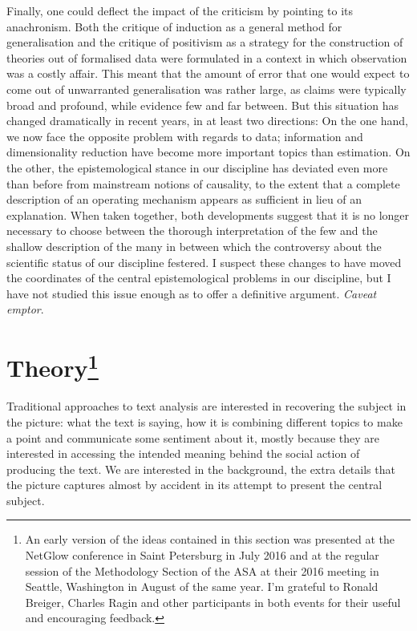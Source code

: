 Finally, one could deflect the impact of the criticism by pointing to its anachronism.
Both the critique of induction as a general method for generalisation and the critique of positivism as a strategy for the construction of theories out of formalised data were formulated in a context in which observation was a costly affair.
This meant that the amount of error that one would expect to come out of unwarranted generalisation was rather large, as claims were typically broad and profound, while evidence few and far between.
But this situation has changed dramatically in recent years, in at least two directions:
On the one hand, we now face the opposite problem with regards to data; information and dimensionality reduction have become more important topics than estimation.
On the other, the epistemological stance in our discipline has deviated even more than before from mainstream notions of causality, to the extent that a complete description of an operating mechanism appears as sufficient in lieu of an explanation.
When taken together, both developments suggest that it is no longer necessary to choose between the thorough interpretation of the few and the shallow description of the many in between which the controversy about the scientific status of our discipline festered.
I suspect these changes to have moved the coordinates of the central epistemological problems in our discipline, but I have not studied this issue enough as to offer a definitive argument.
\emph{Caveat emptor}.

\section[Theory]{Theory\footnote{
    \label{foot:netglow}
    An early version of the ideas contained in this section was presented at the NetGlow conference in Saint Petersburg in July 2016 and at the regular session of the Methodology Section of the ASA at their 2016 meeting in Seattle, Washington in August of the same year.
    I'm grateful to Ronald Breiger, Charles Ragin and other participants in both events for their useful and encouraging feedback.
}}
\label{sec:theory}

Traditional approaches to text analysis are interested in recovering the subject in the picture: what the text is saying, how it is combining different topics to make a point and communicate some sentiment about it, mostly because they are interested in accessing the intended meaning behind the social action of producing the text.
We are interested in the background, the extra details that the picture captures almost by accident in its attempt to present the central subject.

